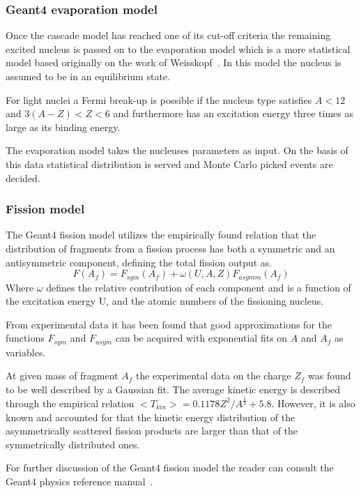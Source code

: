 \subsubsection{Geant4 evaporation model}

Once the cascade model has reached one of its cut-off criteria the remaining excited nucleus is passed on to the evaporation model which is a more statistical model based originally on the work of Weisskopf~\cite{Weisskopf}. In this model the nucleus is assumed to be in an equilibrium state.

For light nuclei a Fermi break-up is possible if the nucleus type satisfies $A < 12$ and $3(A - Z) < Z < 6$ and furthermore has an excitation energy three times as large as its binding energy.

The evaporation model takes the nucleuses parameters as input. On the basis of this data statistical distribution is served and Monte Carlo picked events are decided.

\subsubsection{Fission model}

The Geant4 fission model utilizes the empirically found relation that the distribution of fragments from a fission process has both a symmetric and an antisymmetric component, defining the total fission output as.
\begin{equation}
 F(A_f) = F_{sym}(A_f) + \omega(U,A,Z) F_{asymm}(A_f) 
\label{fissionSymmetricAsymmetric}
\end{equation}
Where $\omega$ defines the relative contribution of each component and is a function of the excitation energy U, and the atomic numbers of the fissioning nucleus.

From experimental data it has been found that good approximations for the functions $F_{sym}$ and $F_{asym}$ can be acquired with exponential fits on $A$ and $A_f$ as variables.

At given mass of fragment $A_f$ the experimental data on the charge $Z_f$ was found to be well described by a Gaussian fit. The average kinetic energy is described through the empirical relation $<T_{kin}>=0.1178Z^2/A^\frac{1}{3} + 5.8$. However, it is also known and accounted for that the kinetic energy distribution of the asymmetrically scattered fission products are larger than that of the symmetrically distributed ones. 

For further discussion of the Geant4 fission model the reader can consult the Geant4 physics reference manual~\cite[Chapter 31.]{physicsManual}.

